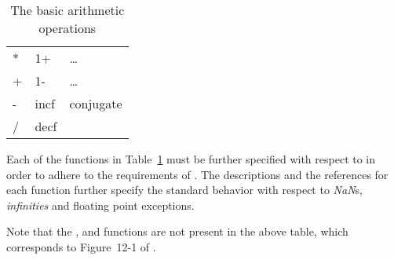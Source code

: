 \documentclass[../../Operations.tex]{subfiles}
\begin{document}
\label{sect:arith-ops}

\begin{table}[h!]
  \centering
  \begin{tt}
    \begin{tabular}{lll}
      * & 1+ & \ldots \\
      + & 1- & \ldots \\
      - & incf & conjugate\\
      / & decf & \\
    \end{tabular}
  \end{tt}
  \caption{The basic \CL{} arithmetic operations}
  \label{table:cl-arit-ops}
\end{table}

\noindent
Each of the functions in Table~\ref{table:cl-arit-ops} must be further
specified with respect to \cite{1996:ANSIHyperSpec} in order to adhere to
the requirements of \IEEEFPStd{}.  The descriptions and the references for
each function further specify the standard \CL{} behavior with respect
to \emph{NaN}s, \emph{infinities} and floating point exceptions.

\vspace*{3mm}

\noindent
Note that the , and  functions are not
present in the above table, which corresponds to Figure~12-1 of
\cite{1996:ANSIHyperSpec}.











\end{document}
